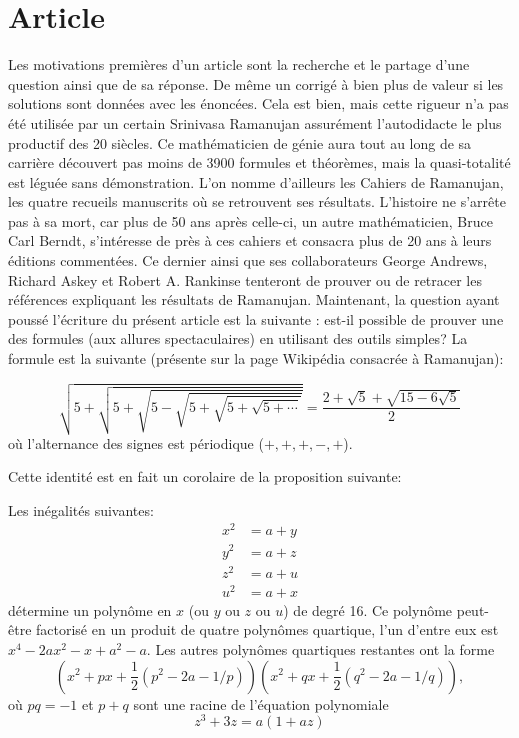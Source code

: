 \section*{Article}
Les motivations premières d'un article sont la recherche et le partage d'une question ainsi que de sa réponse. De même un corrigé à bien plus de valeur si les solutions sont données avec les énoncées. Cela est bien, mais cette rigueur n'a pas été utilisée par un certain Srinivasa Ramanujan assurément l'autodidacte le plus productif des 20 siècles. Ce mathématicien de génie aura tout au long de sa carrière découvert pas moins de 3900 formules et théorèmes, mais la quasi-totalité est léguée sans démonstration. L'on nomme d'ailleurs les Cahiers de Ramanujan, les quatre recueils manuscrits où se retrouvent ses résultats. L'histoire ne s'arrête pas à sa mort, car plus de 50 ans après celle-ci, un autre mathématicien, Bruce Carl Berndt, s'intéresse de près à ces cahiers et consacra plus de 20 ans à leurs éditions commentées. Ce dernier ainsi que ses collaborateurs George Andrews, Richard Askey et Robert A. Rankinse  tenteront de prouver ou de retracer les références expliquant les résultats de Ramanujan. Maintenant, la question ayant poussé l'écriture du présent article est la suivante : est-il possible de prouver une des formules (aux allures spectaculaires) en utilisant des outils simples? La formule est la suivante (présente sur la page Wikipédia consacrée à Ramanujan):
\begin{corollary}
	\begin{equation*}
		{\displaystyle {\sqrt {5+{\sqrt {5+{\sqrt {5-{\sqrt {5+{\sqrt {5+{\sqrt {5+\cdots }}}}}}}}}}}}={\frac {2+{\sqrt {5}}+{\sqrt {15-6{\sqrt {5}}}}}{2}}}
	\end{equation*}
	où l'alternance des signes est périodique (\(+,+,+,-,+\)).
\end{corollary}
Cette identité est en fait un corolaire de la proposition suivante:
\begin{proposition}[\og Entry 32\fg{}]
	Les inégalités suivantes:
	\begin{align*}
		x^2&=a+y\\
		y^2&=a+z\\
		z^2&=a+u\\
		u^2&=a+x
	\end{align*}
	détermine un polynôme en \(x\) (ou \(y\) ou \(z\) ou \(u\)) de degré 16. Ce polynôme peut-être factorisé en un produit de quatre polynômes quartique, l'un d'entre eux est \(x^4-2ax^2-x +a^2-a\). Les autres polynômes quartiques restantes ont la forme 
	\begin{equation}\label{eq:1}
		(x^2+px+\frac{1}{2}(p^2-2a-{1/p}))(x^2+qx+\frac{1}{2}(q^2-2a-{1/q})),
	\end{equation}
	où \(pq=-1\) et \(p+q\) sont une racine de l'équation polynomiale
	\begin{equation}\label{eq:2}
		z^3+3z=a(1+az)
	\end{equation}
\end{proposition}
